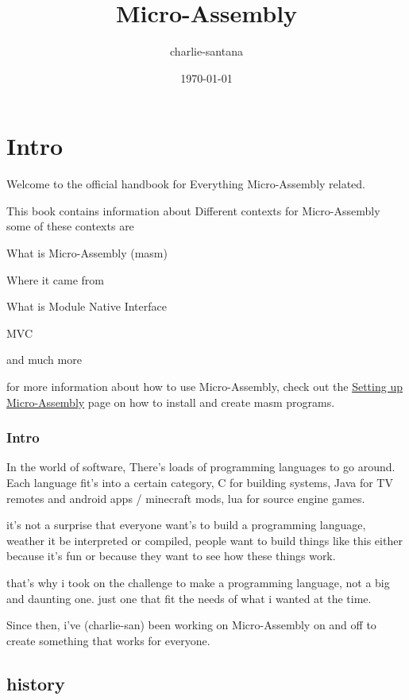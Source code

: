 \documentclass[a4paper,11pt]{book}
\begin{document}
\title{Micro-Assembly}
\author{charlie-santana}
\date{\today}
\maketitle
\tableofcontents
\chapter{Intro}
Welcome to the official handbook for Everything Micro-Assembly related.

This book contains information about Different contexts for Micro-Assembly
some of these contexts are
\begin{list}{*}{}
	\item What is Micro-Assembly (masm)
	\item Where it came from
	\item What is Module Native Interface
	\item MVC
	\item and much more
\end{list}

for more information about how to use Micro-Assembly, check out the \hyperref[setup:masm]{Setting up Micro-Assembly} page on how to install and create masm programs.


\text 

\subsection{Intro}
In the world of software, There's loads of programming languages to go around.
Each language fit's into a certain category, C for building systems, Java for TV remotes and android apps / minecraft mods, lua for source engine games.

it's not a surprise that everyone want's to build a programming language, weather it be interpreted or compiled, people want to build things like this either because it's fun or because they want to see how these things work.

that's why i took on the challenge to make a programming language, not a big and daunting one. just one that fit the needs of what i wanted at the time.

Since then, i've (charlie-san) been working on Micro-Assembly on and off to create something that works for everyone.

\section{history}
\end{document}
